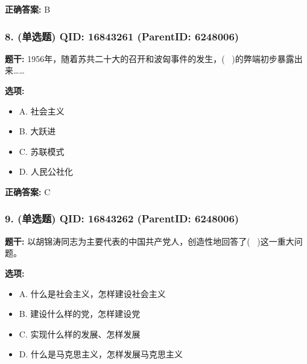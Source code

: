 \documentclass[12pt,UTF8]{ctexart}
\begin{document}
\textbf{正确答案:}
B

\vspace{0.3em}\hrulefill\vspace{0.7em}

\subsubsection*{8. (单选题) \small QID: 16843261 (ParentID: 6248006)}

\textbf{题干:}
1956年，随着苏共二十大的召开和波匈事件的发生，(  )的弊端初步暴露出来……



\textbf{选项:}
\begin{itemize}[leftmargin=*]

  \item A. 社会主义

  \item B. 大跃进

  \item C. 苏联模式

  \item D. 人民公社化

\end{itemize}

\textbf{正确答案:}
C

\vspace{0.3em}\hrulefill\vspace{0.7em}

\subsubsection*{9. (单选题) \small QID: 16843262 (ParentID: 6248006)}

\textbf{题干:}
以胡锦涛同志为主要代表的中国共产党人，创造性地回答了(  )这一重大问题。



\textbf{选项:}
\begin{itemize}[leftmargin=*]

  \item A. 什么是社会主义，怎样建设社会主义

  \item B. 建设什么样的党，怎样建设党

  \item C. 实现什么样的发展、怎样发展

  \item D. 什么是马克思主义，怎样发展马克思主义

\end{itemize}
\end{document}
